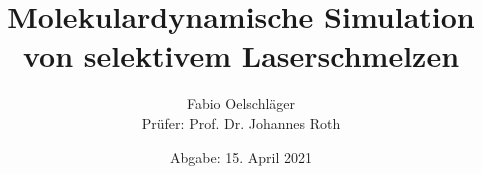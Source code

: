 \documentclass{thesis}
\title{Molekulardynamische Simulation von selektivem Laserschmelzen}
\author{
    Fabio Oelschläger\\
    Prüfer: Prof. Dr. Johannes Roth
}
\date{Abgabe: 15. April 2021}
\begin{document}
    \frontmatter
    \begin{titlepage}
        \maketitle
    \end{titlepage}
    
    

    \tableofcontents

    \mainmatter
    

    \backmatter
    
\end{document}
